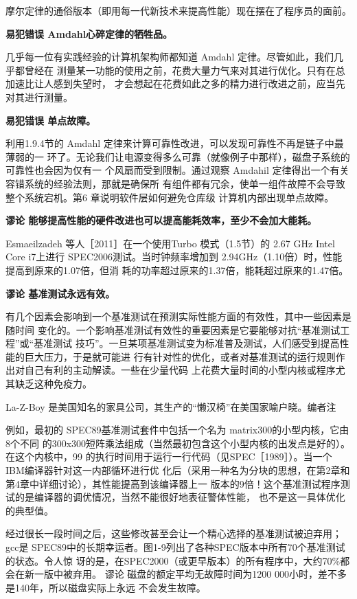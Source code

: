 摩尔定律的通俗版本（即用每一代新技术来提高性能）现在摆在了程序员的面前。

\textbf{易犯错误 Amdahl心碎定律的牺牲品。}

几乎每一位有实践经验的计算机架构师都知道 Amdahl 定律。尽管如此，我们几乎都曾经在
测量某一功能的使用之前，花费大量力气来对其进行优化。只有在总加速比让人感到失望时，
才会想起在花费如此之多的精力进行改进之前，应当先对其进行测量。

\textbf{易犯错误 单点故障。}

利用1.9.4节的 Amdahl 定律来计算可靠性改进，可以发现可靠性不再是链子中最薄弱的一
环了。无论我们让电源变得多么可靠（就像例子中那样），磁盘子系统的可靠性也会因为仅有一
个风扇而受到限制。通过观察 Amdahil 定律得出一个有关容错系统的经验法则，那就是确保所
有组件都有冗余，使单一组件故障不会导致整个系统宕机。第6 章说明软件层如何避免仓库级
计算机内部出现单点故障。

\textbf{谬论 能够提高性能的硬件改进也可以提高能耗效率，至少不会加大能耗。}

Esmaeilzadeh 等人［2011］在一个使用Turbo 模式（1.5节）的 2.67 GHz Intel Core i7上进行
SPEC2006测试。当时钟频率增加到 2.94GHz（1.10倍）时，性能提高到原来的1.07倍，但消
耗的功率超过原来的1.37倍，能耗超过原来的1.47倍。

\textbf{谬论 基准测试永远有效。}

有几个因素会影响到一个基准测试在预测实际性能方面的有效性，其中一些因素是随时间
变化的。一个影响基准测试有效性的重要因素是它要能够对抗“基准测试工程”或“基准测试
技巧”。一旦某项基准测试变为标准普及测试，人们感受到提高性能的巨大压力，于是就可能进
行有针对性的优化，或者对基准测试的运行规则作出对自己有利的主动解读。一些在少量代码
上花费大量时间的小型内核或程序尤其缺乏这种免疫力。

 La-Z-Boy 是美国知名的家具公司，其生产的“懒汉椅”在美国家喻户晓。编者注

例如，最初的 SPEC89基准测试套件中包括一个名为 matrix300的小型内核，它由8个不同
的300x300短阵乘法组成（当然最初包含这个小型内核的出发点是好的）。在这个内核中，99%
的执行时间用于运行一行代码（见SPEC［1989］）。当一个 IBM编译器针对这一内部循环进行优
化后（采用一种名为分块的思想，在第2章和第4章中详细讨论），其性能提高到该编译器上一
版本的9倍！这个基准测试程序测试的是编译器的调优情况，当然不能很好地表征警体性能，
也不是这一具体优化的典型值。

经过很长一段时间之后，这些修改甚至会让一个精心选择的基准测试被迫弃用；gcc是
SPEC89中的长期幸运者。图1-9列出了各种SPEC版本中所有70个基准测试的状态。令人惊
讶的是，在SPEC2000（或更早版本）的所有程序中，大约70\%都会在新一版中被弃用。
谬论 磁盘的额定平均无故障时间为1200 000小时，差不多是140年，所以磁盘实际上永远
不会发生故障。

